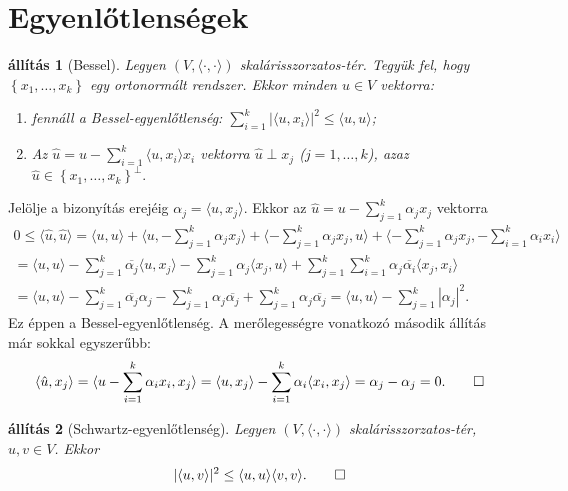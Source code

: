 \documentclass[9pt, a4paper, showtrims]{memoir}
\makeatletter
\renewenvironment{proof}[1][\proofname]
    {\par\pushQED{\qed}%
    \normalfont \topsep6\p@\@plus6\p@\relax
    \trivlist
    \item[\hskip\labelsep
        \itshape
    #1\@addpunct{:}]\ignorespaces}
    {\popQED\endtrivlist\@endpefalse}
\theoremstyle{plain}
\newtheorem{proposition}{állítás}[chapter]
\theoremstyle{remark}
\theoremstyle{definition}
\DeclareMathOperator{\lin}{lin}
\newcommand{\ip}[2]{\langle#1,#2\rangle}
\makeatother
\begin{document}
\section{Egyenlőtlenségek}
\begin{proposition}[Bessel]\label{pr:Bessel}
	Legyen $\left( V,\ip{\cdot}{\cdot} \right)$ skalárisszorzatos-tér.
	Tegyük fel, hogy $\left\{ x_1,\ldots,x_k \right\}$ egy ortonormált rendszer.
	Ekkor minden $u\in V$ vektorra:
	\begin{enumerate}
		\item
		      fennáll a  \emph{Bessel-egyenlőtlenség:}
		      $\sum_{i=1}^k|\ip{u}{x_i}|^2\leq\ip{u}{u}$;
		\item
		      Az
		      \(
		      \hat{u}=u-\sum_{i=1}^k\ip{u}{x_i}x_i
		      \)
		      vektorra $\hat{u}\perp x_j$
		      ($j=1,\ldots,k$), azaz
		      \(
		      \hat{u}\in
		      \left\{ x_1,\ldots,x_k \right\}^\perp
		      .
		      \)
		      \qedhere
	\end{enumerate}
\end{proposition}
\begin{proof}
	Jelölje a bizonyítás erejéig
	\begin{math}
		\alpha_j=\ip{u}{x_j}.
	\end{math}
	Ekkor az $\hat{u}=u-\sum_{j=1}^k\alpha_jx_j$ vektorra
	\begin{multline*}
		0
		\leq
		\ip{\hat{u}}{\hat{u}}
		=
		\ip{u}{u}+\ip{u}{-\sum_{j=1}^k\alpha_jx_j}+\ip{-\sum_{j=1}^k\alpha_jx_j}{u}+\ip{-\sum_{j=1}^k\alpha_jx_j}{-\sum_{i=1}^k\alpha_ix_i}
		\\
		=
		\ip{u}{u}-\sum_{j=1}^k\overline{\alpha_j}\ip{u}{x_j}-\sum_{j=1}^k\alpha_j\ip{x_j}{u}+\sum_{j=1}^k\sum_{i=1}^k\alpha_j\overline{\alpha_i}\ip{x_j}{x_i}
		\\
		=
		\ip{u}{u}-\sum_{j=1}^k\overline{\alpha_j}\alpha_j-\sum_{j=1}^k\alpha_j\overline{\alpha_j}+\sum_{j=1}^k\alpha_j\overline{\alpha_j}
		=\ip{u}{u}-\sum_{j=1}^k|\alpha_j|^2.
	\end{multline*}
	Ez éppen a Bessel-egyenlőtlenség.
	A merőlegességre vonatkozó második állítás már sokkal egyszerűbb:
	\[
		\ip{\hat{u}}{x_j}
		=
		\ip{u-\sum_{i=1}^k\alpha_ix_i}{x_j}
		=
		\ip{u}{x_j}-\sum_{i=1}^k\alpha_i\ip{x_i}{x_j}
		=
		\alpha_j-\alpha_j
		=
		0.
		\qedhere
	\]
\end{proof}
\begin{proposition}[Schwartz-egyenlőtlenség]
	Legyen $\left( V,\ip{\cdot}{\cdot} \right)$ skalárisszorzatos-tér,
	$u,v\in V$.
	Ekkor
	\[
		|\ip{u}{v}|^2\leq \ip{u}{u}\ip{v}{v}.\qedhere
	\]
\end{proposition}
\end{document}
